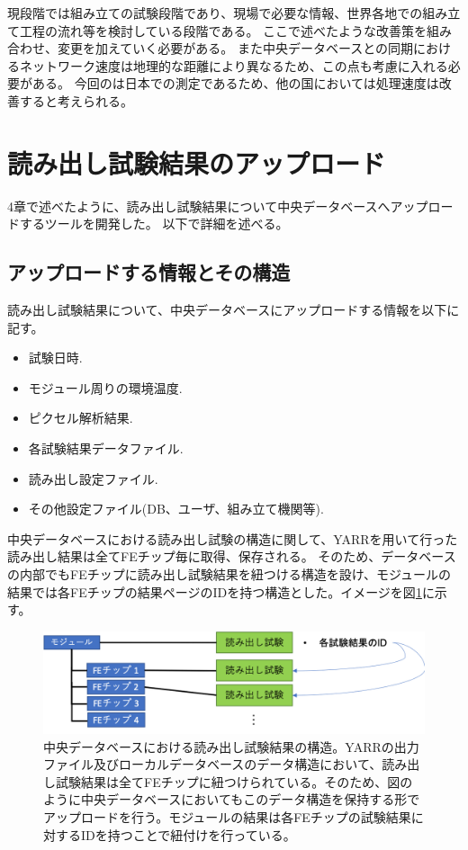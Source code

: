 現段階では組み立ての試験段階であり、現場で必要な情報、世界各地での組み立て工程の流れ等を検討している段階である。
ここで述べたような改善策を組み合わせ、変更を加えていく必要がある。
また中央データベースとの同期におけるネットワーク速度は地理的な距離により異なるため、この点も考慮に入れる必要がある。
今回のは日本での測定であるため、他の国においては処理速度は改善すると考えられる。


\clearpage
\section{読み出し試験結果のアップロード}
4章で述べたように、読み出し試験結果について中央データベースへアップロードするツールを開発した。
以下で詳細を述べる。
\subsection{アップロードする情報とその構造}
読み出し試験結果について、中央データベースにアップロードする情報を以下に記す。
\begin{itemize}
  \item 試験日時.
  \item モジュール周りの環境温度.
  \item ピクセル解析結果.
  \item 各試験結果データファイル.
  \item 読み出し設定ファイル.
  \item その他設定ファイル(DB、ユーザ、組み立て機関等).
\end{itemize}

中央データベースにおける読み出し試験の構造に関して、YARRを用いて行った読み出し結果は全てFEチップ毎に取得、保存される。
そのため、データベースの内部でもFEチップに読み出し試験結果を紐つける構造を設け、モジュールの結果では各FEチップの結果ページのIDを持つ構造とした。イメージを図\ref{structure_for_electrical_tests}に示す。

\begin{figure}[bpt]\centering
  \begin{center}
  \includegraphics[width=13cm]{./structure_for_electrical_tests.png}
  \caption[中央データベースにおける読み出し試験結果の構造]{中央データベースにおける読み出し試験結果の構造。YARRの出力ファイル及びローカルデータベースのデータ構造において、読み出し試験結果は全てFEチップに紐つけられている。そのため、図のように中央データベースにおいてもこのデータ構造を保持する形でアップロードを行う。モジュールの結果は各FEチップの試験結果に対するIDを持つことで紐付けを行っている。}
  \label{structure_for_electrical_tests}
  \end{center}
\end{figure}

